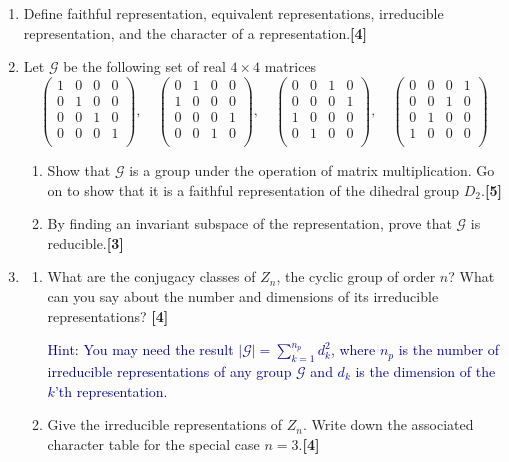 \documentclass[a4paper]{article}
\begin{document}
\begin{qns}\leavevmode
\begin{enumerate}[label=(\roman*)]
\item Define faithful representation, equivalent representations, irreducible representation, and the character of a representation.\hfill\textbf{[4]}
\item Let $\mathcal{G}$ be the following set of real $4\times 4$ matrices
$$\begin{pmatrix}1&0&0&0\\0&1&0&0\\0&0&1&0\\0&0&0&1\\\end{pmatrix},\quad\begin{pmatrix}0&1&0&0\\1&0&0&0\\0&0&0&1\\0&0&1&0\\\end{pmatrix},\quad\begin{pmatrix}0&0&1&0\\0&0&0&1\\1&0&0&0\\0&1&0&0\\\end{pmatrix},\quad\begin{pmatrix}0&0&0&1\\0&0&1&0\\0&1&0&0\\1&0&0&0\\\end{pmatrix}$$
\begin{enumerate}[label=(\alph*)]
\item Show that $\mathcal{G}$ is a group under the operation of matrix multiplication. Go on to show that it is a faithful representation of the dihedral group $D_2$.\hfill\textbf{[5]}\item By finding an invariant subspace of the representation, prove that $\mathcal{G}$ is reducible.\hfill\textbf{[3]}
\end{enumerate}
\item 
\begin{enumerate}[label=(\alph*)]
\item What are the conjugacy classes of $Z_n$, the cyclic group of order $n$? What can you say about the number and dimensions of its irreducible representations? \hfill\textbf{[4]}
\begin{mdframed}
\textcolor{darkblue}{Hint: You may need the result $|\mathcal{G}|=\sum_{k=1}^{n_p}d_k^2$, where $n_p$ is the number of irreducible representations of any group $\mathcal{G}$ and $d_k$ is the dimension of the $k$’th representation.}
\end{mdframed}
\item Give the irreducible representations of $Z_n$. Write down the associated character table for the special case $n = 3$.\hfill\textbf{[4]}
\end{enumerate}
\end{enumerate}
\end{qns}
\end{document}
